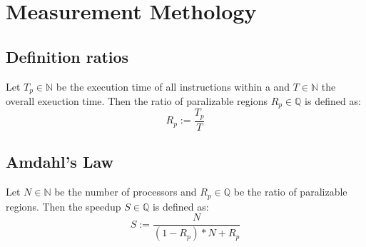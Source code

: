 \section{Measurement Methology}
\subsection{Definition ratios}
Let \(T_p\in\mathbb{N}\) be the execution time of all instructions within a \scop and \(T\in\mathbb{N}\) the overall exeuction time.
Then the ratio of paralizable regions \(R_p\in\mathbb{Q}\) is defined as:
\[R_p := \frac{T_p}{T}\]

\begin{comment}
    Let \(SI_s\in\mathbb{N}\) be the number of instructions not within a \scop, \(PI_s\in\mathbb{N}\) the number of instructions within a \scop and \(AI\in\mathbb{N}\) the number of all instructions such that \(SI_s + PI_s = AI\).
    Then the \scop ratio is defined as:
    \[RS_{par} := \frac{PI_s}{AI}\]
    Let \(SI_p\in\mathbb{N}\) be the number of instructions not within a parent of a \scop, \(PI_p\in\mathbb{N}\) the number of instructions within a parent of a \scop and \(AI\in\mathbb{N}\) the number of all instructions such that \(SI_p + PI_p = AI\).
    Then the parent-of-\scop ratio is defined as:
    \[RP_{par} := \frac{PI_p}{AI}\]
\end{comment}
\subsection[Amdahl's Law]{Amdahl's Law \cite{AmdahlsLaw}}
Let \(N\in\mathbb{N}\) be the number of processors and \(R_p\in\mathbb{Q}\) be the ratio of paralizable regions.
Then the speedup \(S\in\mathbb{Q}\) is defined as:
\[S := \frac{N}{(1-R_p)*N+R_p}\]
\begin{comment}
    \subsection[Amdahl's Law Jenkov]{Amdahl's Law Jenkov \cite{AmdahlsLawJenkov}}
    Let \(T\in\mathbb{Q}\) be the overall execution time, \(B\in\mathbb{Q}\) the execution time of the non-paralizable parts and \(N\in\mathbb{N}\) the number of processors.
    Then the speedup \(S\in\mathbb{Q}\) is defined as:
    \[S(B) := B+\frac{T-B}{N}\]
\end{comment}
